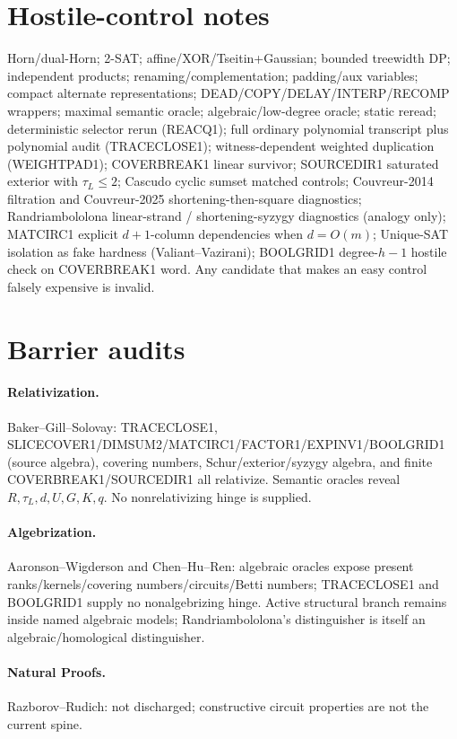 \documentclass[11pt]{article}
\begin{document}
\section*{Hostile-control notes}
Horn/dual-Horn; 2-SAT; affine/XOR/Tseitin+Gaussian; bounded treewidth DP; independent products;
renaming/complementation; padding/aux variables; compact alternate representations;
DEAD/COPY/DELAY/INTERP/RECOMP wrappers; maximal semantic oracle; algebraic/low-degree oracle;
static reread; deterministic selector rerun (REACQ1); full ordinary polynomial transcript plus
polynomial audit (TRACECLOSE1); witness-dependent weighted duplication (WEIGHTPAD1);
COVERBREAK1 linear survivor; SOURCEDIR1 saturated exterior with $\tau_L\le 2$; Cascudo cyclic
sumset matched controls; Couvreur-2014 filtration and Couvreur-2025 shortening-then-square
diagnostics; Randriambololona linear-strand / shortening-syzygy diagnostics (analogy only);
MATCIRC1 explicit $d+1$-column dependencies when $d=O(m)$; Unique-SAT isolation as fake
hardness (Valiant--Vazirani); BOOLGRID1 degree-$h-1$ hostile check on COVERBREAK1 word.
Any candidate that makes an easy control falsely expensive is invalid.

\section*{Barrier audits}
\paragraph{Relativization.}
Baker--Gill--Solovay: TRACECLOSE1, SLICECOVER1/DIMSUM2/MATCIRC1/FACTOR1/EXPINV1/BOOLGRID1
(source algebra), covering numbers, Schur/exterior/syzygy algebra, and finite
COVERBREAK1/SOURCEDIR1 all relativize. Semantic oracles reveal $R,\tau_L,d,U,G,K,q$.
No nonrelativizing hinge is supplied.
\paragraph{Algebrization.}
Aaronson--Wigderson and Chen--Hu--Ren: algebraic oracles expose present ranks/kernels/covering
numbers/circuits/Betti numbers; TRACECLOSE1 and BOOLGRID1 supply no nonalgebrizing hinge.
Active structural branch remains inside named algebraic models; Randriambololona's
distinguisher is itself an algebraic/homological distinguisher.
\paragraph{Natural Proofs.}
Razborov--Rudich: not discharged; constructive circuit properties are not the current spine.
\end{document}
